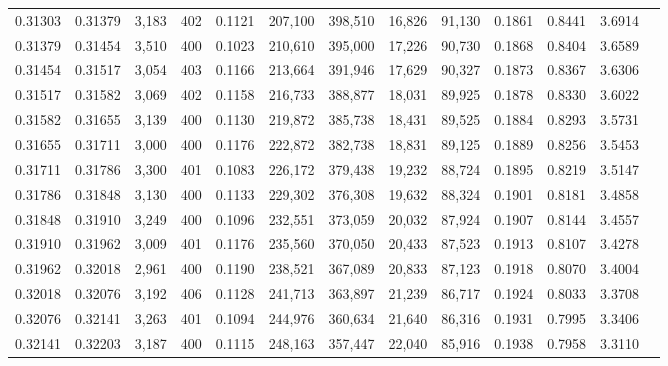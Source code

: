 \begin{tabular}{rrrrrrrrrrrrr}
0.31303 & 0.31379 &  3,183 & 402 &                                     0.1121 & 207,100 & 398,510 &  16,826 &  91,130 & 0.1861 & 0.8441 & 3.6914 \\
0.31379 & 0.31454 &  3,510 & 400 &                                     0.1023 & 210,610 & 395,000 &  17,226 &  90,730 & 0.1868 & 0.8404 & 3.6589 \\
0.31454 & 0.31517 &  3,054 & 403 &                                     0.1166 & 213,664 & 391,946 &  17,629 &  90,327 & 0.1873 & 0.8367 & 3.6306 \\
0.31517 & 0.31582 &  3,069 & 402 &                                     0.1158 & 216,733 & 388,877 &  18,031 &  89,925 & 0.1878 & 0.8330 & 3.6022 \\
0.31582 & 0.31655 &  3,139 & 400 &                                     0.1130 & 219,872 & 385,738 &  18,431 &  89,525 & 0.1884 & 0.8293 & 3.5731 \\
0.31655 & 0.31711 &  3,000 & 400 &                                     0.1176 & 222,872 & 382,738 &  18,831 &  89,125 & 0.1889 & 0.8256 & 3.5453 \\
0.31711 & 0.31786 &  3,300 & 401 &                                     0.1083 & 226,172 & 379,438 &  19,232 &  88,724 & 0.1895 & 0.8219 & 3.5147 \\
0.31786 & 0.31848 &  3,130 & 400 &                                     0.1133 & 229,302 & 376,308 &  19,632 &  88,324 & 0.1901 & 0.8181 & 3.4858 \\
0.31848 & 0.31910 &  3,249 & 400 &                                     0.1096 & 232,551 & 373,059 &  20,032 &  87,924 & 0.1907 & 0.8144 & 3.4557 \\
0.31910 & 0.31962 &  3,009 & 401 &                                     0.1176 & 235,560 & 370,050 &  20,433 &  87,523 & 0.1913 & 0.8107 & 3.4278 \\
0.31962 & 0.32018 &  2,961 & 400 &                                     0.1190 & 238,521 & 367,089 &  20,833 &  87,123 & 0.1918 & 0.8070 & 3.4004 \\
0.32018 & 0.32076 &  3,192 & 406 &                                     0.1128 & 241,713 & 363,897 &  21,239 &  86,717 & 0.1924 & 0.8033 & 3.3708 \\
0.32076 & 0.32141 &  3,263 & 401 &                                     0.1094 & 244,976 & 360,634 &  21,640 &  86,316 & 0.1931 & 0.7995 & 3.3406 \\
0.32141 & 0.32203 &  3,187 & 400 &                                     0.1115 & 248,163 & 357,447 &  22,040 &  85,916 & 0.1938 & 0.7958 & 3.3110 \\

\end{tabular}
